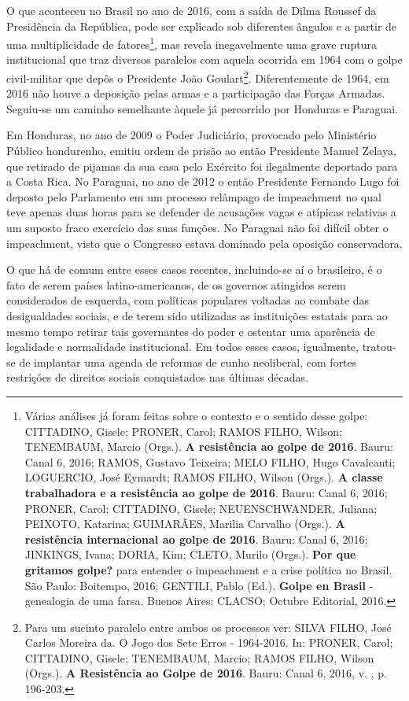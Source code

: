 O que aconteceu no Brasil no ano de 2016, com a saída de Dilma Roussef
da Presidência da República, pode ser explicado sob diferentes ângulos e
a partir de uma multiplicidade de fatores\footnote{Várias análises já
  foram feitas sobre o contexto e o sentido desse golpe: CITTADINO,
  Gisele; PRONER, Carol; RAMOS FILHO, Wilson; TENEMBAUM, Marcio (Orgs.).
  \textbf{A resistência ao golpe de 2016}. Bauru: Canal 6, 2016; RAMOS,
  Gustavo Teixeira; MELO FILHO, Hugo Cavalcanti; LOGUERCIO, José
  Eymardt; RAMOS FILHO, Wilson (Orgs.). \textbf{A classe trabalhadora e
  a resistência ao golpe de 2016}. Bauru: Canal 6, 2016; PRONER, Carol;
  CITTADINO, Gisele; NEUENSCHWANDER, Juliana; PEIXOTO, Katarina;
  GUIMARÃES, Marilia Carvalho (Orgs.). \textbf{A resistência
  internacional ao golpe de 2016}. Bauru: Canal 6, 2016; JINKINGS,
  Ivana; DORIA, Kim; CLETO, Murilo (Orgs.). \textbf{Por que gritamos
  golpe?} para entender o impeachment e a crise política no Brasil. São
  Paulo: Boitempo, 2016; GENTILI, Pablo (Ed.). \textbf{Golpe en Brasil}
  - genealogia de uma farsa. Buenos Aires: CLACSO; Octubre Editorial,
  2016.}, mas revela inegavelmente uma grave ruptura institucional que
traz diversos paralelos com aquela ocorrida em 1964 com o golpe
civil-militar que depôs o Presidente João Goulart\footnote{Para um
  sucinto paralelo entre ambos os processos ver: SILVA FILHO, José
  Carlos Moreira da. O Jogo dos Sete Erros - 1964-2016. In: PRONER,
  Carol; CITTADINO, Gisele; TENEMBAUM, Marcio; RAMOS FILHO, Wilson
  (Orgs.). \textbf{A Resistência ao Golpe de 2016}. Bauru: Canal 6,
  2016, v. , p. 196-203.}. Diferentemente de 1964, em 2016 não houve a
deposição pelas armas e a participação das Forças Armadas. Seguiu-se um
caminho semelhante àquele já percorrido por Honduras e Paraguai.

Em Honduras, no ano de 2009 o Poder Judiciário, provocado pelo
Ministério Público hondurenho, emitiu ordem de prisão ao então
Presidente Manuel Zelaya, que retirado de pijamas da sua casa pelo
Exército foi ilegalmente deportado para a Costa Rica. No Paraguai, no
ano de 2012 o então Presidente Fernando Lugo foi deposto pelo Parlamento
em um processo relâmpago de impeachment no qual teve apenas duas horas
para se defender de acusações vagas e atípicas relativas a um suposto
fraco exercício das suas funções. No Paraguai não foi difícil obter o
impeachment, visto que o Congresso estava dominado pela oposição
conservadora.

O que há de comum entre esses casos recentes, incluindo-se aí o
brasileiro, é o fato de serem países latino-americanos, de os governos
atingidos serem considerados de esquerda, com políticas populares
voltadas ao combate das desigualdades sociais, e de terem sido
utilizadas as instituições estatais para ao mesmo tempo retirar tais
governantes do poder e ostentar uma aparência de legalidade e
normalidade institucional. Em todos esses casos, igualmente, tratou-se
de implantar uma agenda de reformas de cunho neoliberal, com fortes
restrições de direitos sociais conquistados nas últimas décadas.

